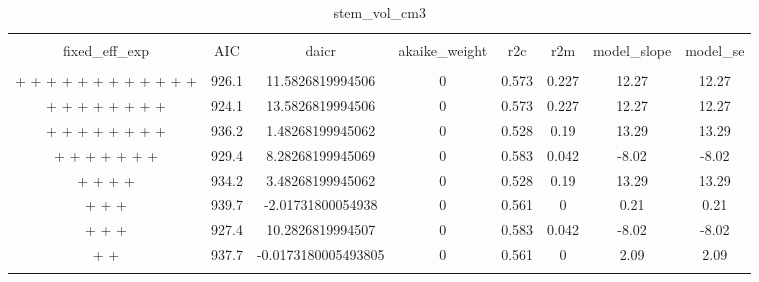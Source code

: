 
\begin{table}[!htbp] \centering 
  \caption{stem_vol_cm3} 
  \label{stem_vol_cm3} 
\begin{tabular}{@{\extracolsep{5pt}} cccccccc} 
\\[-1.8ex]\hline 
\hline \\[-1.8ex] 
fixed\_eff\_exp & AIC & daicr & akaike\_weight & r2c & r2m & model\_slope & model\_se \\ 
\hline \\[-1.8ex] 
 +  +  +  +  +  +  +  +  +  +  +  +  & 926.1 & 11.5826819994506 & 0 & 0.573 & 0.227 & 12.27 & 12.27 \\ 
 +  +  +  +  +  +  +  +  & 924.1 & 13.5826819994506 & 0 & 0.573 & 0.227 & 12.27 & 12.27 \\ 
 +  +  +  +  +  +  +  +  & 936.2 & 1.48268199945062 & 0 & 0.528 & 0.19 & 13.29 & 13.29 \\ 
 +  +  +  +  +  +  +  & 929.4 & 8.28268199945069 & 0 & 0.583 & 0.042 & -8.02 & -8.02 \\ 
 +  +  +  +  & 934.2 & 3.48268199945062 & 0 & 0.528 & 0.19 & 13.29 & 13.29 \\ 
 +  +  +  & 939.7 & -2.01731800054938 & 0 & 0.561 & 0 & 0.21 & 0.21 \\ 
 +  +  +  & 927.4 & 10.2826819994507 & 0 & 0.583 & 0.042 & -8.02 & -8.02 \\ 
 +  +  & 937.7 & -0.0173180005493805 & 0 & 0.561 & 0 & 2.09 & 2.09 \\ 
\hline \\[-1.8ex] 
\end{tabular} 
\end{table} 
